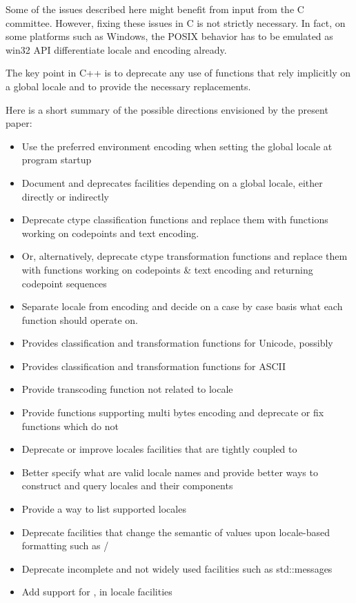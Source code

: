 \documentclass{wg21}
\begin{document}
Some of the issues described here might benefit from input from the C committee.
However, fixing these issues in C is not strictly necessary.
In fact, on some platforms such as Windows, the POSIX behavior has to be emulated as win32 API differentiate locale and encoding already.

The key point in C++ is to deprecate any use of functions that rely implicitly on a global locale and to provide the necessary replacements.

Here is a short summary of the possible directions envisioned by the present paper:

\begin{itemize}
\item Use the preferred environment encoding when setting the global  locale at program startup
\item Document and deprecates facilities depending on a global locale, either directly or indirectly
\item Deprecate ctype classification functions and replace them with functions working on codepoints and text encoding.
\item Or, alternatively, deprecate ctype transformation functions and replace them with functions working on codepoints \& text encoding and returning codepoint sequences
\item Separate locale from encoding and decide on a case by case basis what each function should operate on.
\item Provides classification and transformation functions for Unicode, possibly 
\item Provides  classification and transformation functions for ASCII
\item Provide transcoding function not related to locale
\item Provide functions supporting multi bytes encoding and deprecate or fix functions which do not
\item Deprecate or improve locales facilities that are tightly coupled to 
\item Better specify what are valid locale names and provide better ways to construct and query locales and their components
\item Provide a way to list supported locales
\item Deprecate facilities that change the semantic of values upon locale-based formatting such as /
\item Deprecate incomplete and not widely used facilities such as std::messages
\item Add support for ,  in locale facilities
\end{itemize}
\end{document}
